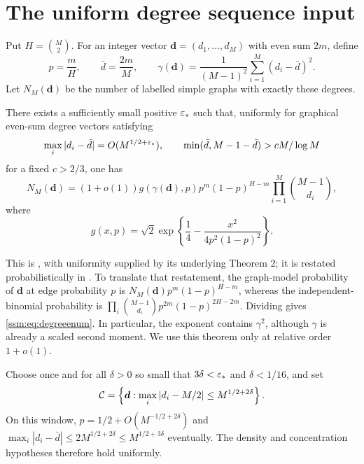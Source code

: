\section{The uniform degree sequence input}\label{ssm:sec:enumeration}
Put $H=\binom M2$. For an integer vector $\boldsymbol d=(d_1,\ldots,d_M)$ with even sum $2m$, define
\begin{equation}\label{ssm:eq:graphparameters}
 p=\frac mH,\qquad \bar d=\frac{2m}M,\qquad
 \gamma(\boldsymbol d)=\frac1{(M-1)^2}\sum_{i=1}^M(d_i-\bar d)^2.
\end{equation}
Let $N_M(\boldsymbol d)$ be the number of labelled simple graphs with exactly these degrees.

\begin{theorem}\label{ssm:thm:MW}
There exists a sufficiently small positive $\varepsilon_*$ such that, uniformly for graphical even-sum degree vectors satisfying
\[
 \max_i|d_i-\bar d|=O(M^{1/2+\varepsilon_*}),\qquad
 \min(\bar d,M-1-\bar d)>cM/\log M
\]
for a fixed $c>2/3$, one has
\begin{equation}\label{ssm:eq:degreeenum}
 N_M(\boldsymbol d)=(1+o(1))g(\gamma(\boldsymbol d),p)
 p^m(1-p)^{H-m}\prod_{i=1}^M\binom{M-1}{d_i},
\end{equation}
where
\begin{equation}\label{ssm:eq:g}
 g(x,p)=\sqrt2\exp\left\{\frac14-\frac{x^2}{4p^2(1-p)^2}\right\}.
\end{equation}
\end{theorem}

This is \cite[Theorem 3(ii)]{mw}, with uniformity supplied by its underlying Theorem 2; it is restated probabilistically in \cite[equations (17)--(18)]{mww}. To translate that restatement, the graph-model probability of $\boldsymbol d$ at edge probability $p$ is $N_M(\boldsymbol d)p^m(1-p)^{H-m}$, whereas the independent-binomial probability is
$\prod_i\binom{M-1}{d_i}p^{2m}(1-p)^{2H-2m}$. Dividing gives \eqref{ssm:eq:degreeenum}. In particular, the exponent contains $\gamma^2$, although $\gamma$ is already a scaled second moment. We use this theorem only at relative order $1+o(1)$.

Choose once and for all $\delta>0$ so small that $3\delta<\varepsilon_*$ and $\delta<1/16$, and set
\begin{equation}\label{ssm:eq:window}
 \mathcal C=\left\{\boldsymbol d:\max_i|d_i-M/2|\le M^{1/2+2\delta}\right\}.
\end{equation}
On this window, $p=1/2+O(M^{-1/2+2\delta})$ and
$\max_i|d_i-\bar d|\le2M^{1/2+2\delta}\le M^{1/2+3\delta}$ eventually. The density and concentration hypotheses therefore hold uniformly.

